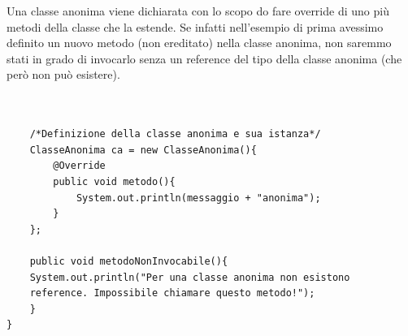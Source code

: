 Una classe anonima viene dichiarata con lo scopo do fare override di uno  più metodi della classe che la estende. Se infatti nell'esempio di prima avessimo definito un nuovo metodo (non ereditato) nella classe anonima, non saremmo stati in grado di invocarlo senza un reference del tipo della classe anonima (che però non può esistere).
\begin{lstlisting}


	/*Definizione della classe anonima e sua istanza*/
	ClasseAnonima ca = new ClasseAnonima(){
		@Override
		public void metodo(){
			System.out.println(messaggio + "anonima");
		}
	};

	public void metodoNonInvocabile(){
	System.out.println("Per una classe anonima non esistono 
	reference. Impossibile chiamare questo metodo!");
	}
}
\end{lstlisting}
